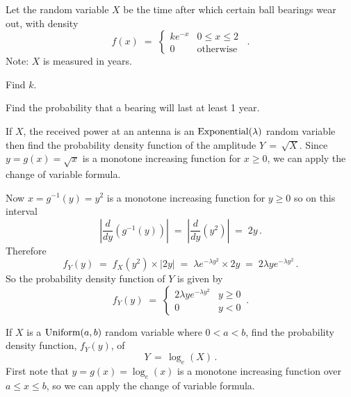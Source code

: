 \begin{ExerciseList}
\Exercise 
Let the random variable $X$ be the time  after which certain ball bearings wear out, with density
$$f(x)\;=\;\begin{cases} ke^{-x}&0\leq x\leq 2\\0&\textrm{otherwise}\end{cases}\enspace.$$
Note: $X$ is measured in  years.
\be
\item Find $k$.
\item Find the probability that a bearing will last at least 1 year.
\ee
\Answer
\be
\item


\item
\ba{\p(X\geq1)&=1\,-\,\p(X<1)\\[3pt]
&=\;1\;-\;\int^1_0 k e^{-x}\,dx\\[3pt]
&=\;1\;+\;k\left(e^{-x}\right]^1_0\\[3pt]
&=\;1\;+\;\frac{e^{-1}-1}{1-e^{-2}}\\[3pt]
&\approx\;0.2689}

\ee

\Exercise
If $X$, the received power at an antenna is an $\mbox{{\rm Exponential}}(\lambda)$ random variable then find the probability density function of the amplitude $Y\,=\, \sqrt X$.
\Answer
Since $y=g(x) = \sqrt{x}$ is a monotone increasing function for $x \geqslant 0$,  we can apply the change of variable formula.

Now $x= g^{-1}(y) = y^2$ is a monotone increasing function for $y\geqslant 0$ so on this interval
\[
\left|  \frac{d}{dy}\left(g^{-1}(y)\right)\right|\;=\; \left|  \frac{d}{dy}\left( y^2\right)\right|\;=\; 2y\,.\]
Therefore
\[
f_Y(y) 
\;=\; f_X\left(  y^2\right) \times  \left| 2y \right|
\;=\;  \lambda e ^{-\lambda y^2} \times  2y  \;=\;   2 \lambda y e ^{-\lambda y^2}\,.
\]
So the  probability density function  of $Y$ is given by
\[
f_Y(y)\;=\;\begin{cases} \displaystyle  2 \lambda y e ^{-\lambda y^2}   &    y\geqslant 0 \\ 0 & y <0
\end{cases} \,.
\]


\Exercise
If $X$ is a $\mbox{{\rm Uniform}}(a,b)$ random variable where $0 < a < b$, find  the probability density function, $f_Y (y)$, of \[ Y\,=\, \log_e(X) \, .\]
\Answer
First note that $y=g(x) = \log_e(x)$ is a monotone increasing function over  $a \leqslant x \leqslant b$, so we can apply the change of variable formula.


\end{ExerciseList}
